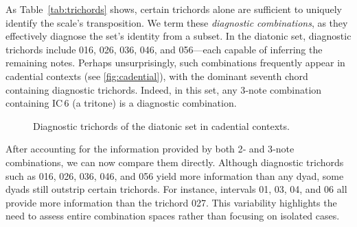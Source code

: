 \documentclass[10pt,twocolumn]{article}
\numberwithin{equation}{section} %
\begin{document}
    

    As Table~\ref{tab:trichords} shows, certain trichords alone are sufficient to uniquely identify the scale's transposition.
    We term these \textit{diagnostic combinations}, as they effectively diagnose the set's identity from a subset.
    In the diatonic set, diagnostic trichords include 016, 026, 036, 046, and 056—each capable of inferring the remaining notes.
    Perhaps unsurprisingly, such combinations frequently appear in cadential contexts (see \autoref{fig:cadential}), with the dominant seventh chord containing diagnostic trichords.
    Indeed, in this set, any 3‑note combination containing IC\,6 (a tritone) is a diagnostic combination.
    \begin{figure}[htbp]
        \centering
        \caption{Diagnostic trichords of the diatonic set in cadential contexts.}
        \label{fig:cadential}
    \end{figure}

    After accounting for the information provided by both 2‑ and 3‑note combinations, we can now compare them directly.
    Although diagnostic trichords such as 016, 026, 036, 046, and 056 yield more information than any dyad, some dyads still outstrip certain trichords.
    For instance, intervals 01, 03, 04, and 06 all provide more information than the trichord 027.
    This variability highlights the need to assess entire combination spaces rather than focusing on isolated cases.
\end{document}
